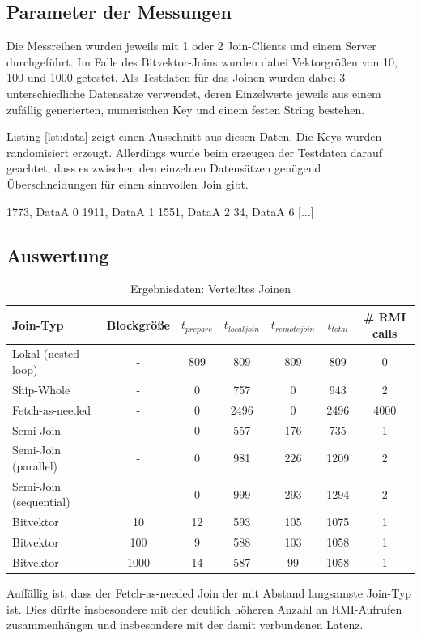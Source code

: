\documentclass[fontsize=12pt,a4paper,headinclude=no,headings=small]{scrartcl}
\begin{document}
\subsection{Parameter der Messungen}
Die Messreihen wurden jeweils mit 1 oder 2 Join-Clients und einem Server durchgeführt. Im Falle des Bitvektor-Joins wurden dabei Vektorgrößen von 10, 100 und 1000 getestet. Als Testdaten für das Joinen wurden dabei 3 unterschiedliche Datensätze verwendet, deren Einzelwerte jeweils aus einem zufällig generierten, numerischen Key und einem festen String bestehen.

Listing \ref{lst:data} zeigt einen Ausschnitt aus diesen Daten. Die Keys wurden randomisiert erzeugt. Allerdings wurde beim erzeugen der Testdaten darauf geachtet, dass es zwischen den einzelnen Datensätzen genügend Überschneidungen für einen sinnvollen Join gibt. 

\begin{code}[label=lst:data,frame=tblr,caption=Auszug aus den Join-Testdaten]
1773, DataA 0
1911, DataA 1
1551, DataA 2
34, DataA 6
[...]
\end{code}

\subsection{Auswertung}

\begin{table}[htp]
\begin{tabularx}{\textwidth}{ |X|c|c|c|c|c|c| }
\hline
Join-Typ & Blockgröße & $t_{prepare}$ & $t_{localjoin}$ & $t_{remotejoin}$  & $t_{total}$ & \# RMI calls \\
\hline
Lokal (nested loop) & - & 809 & 809 & 809 & 809 & 0 \\
Ship-Whole & - & 0 & 757 & 0 & 943 & 2 \\
Fetch-as-needed & - & 0 & 2496 & 0 & 2496 & 4000 \\
Semi-Join & - & 0 & 557 & 176 & 735 & 1 \\
Semi-Join (parallel) & - & 0 & 981 & 226 & 1209 & 2 \\
Semi-Join (sequential) & - & 0 & 999 & 293 & 1294 & 2 \\
Bitvektor & 10 & 12 & 593 & 105 & 1075 & 1 \\
Bitvektor & 100 & 9 & 588 & 103 & 1058 & 1 \\
Bitvektor & 1000 & 14 & 587 & 99 & 1058 & 1 \\
\hline
\end{tabularx}
\caption{Ergebnisdaten: Verteiltes Joinen}
\end{table}
Auffällig ist, dass der Fetch-as-needed Join der mit Abstand langsamste Join-Typ ist. Dies dürfte insbesondere mit der deutlich höheren Anzahl an RMI-Aufrufen zusammenhängen und insbesondere mit der damit verbundenen Latenz.
\end{document}
